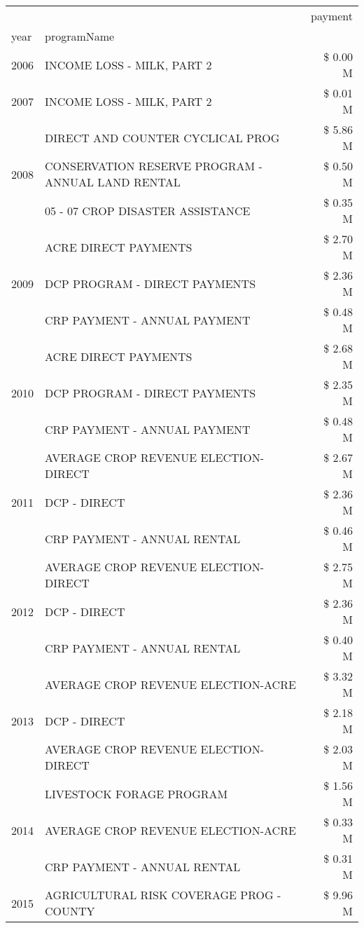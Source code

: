 \begin{tabular}{llr}
\toprule
 &  & payment \\
year & programName &  \\
\midrule
2006 & INCOME LOSS - MILK, PART 2 & \$ 0.00 M \\
\cline{1-3}
2007 & INCOME LOSS - MILK, PART 2 & \$ 0.01 M \\
\cline{1-3}
\multirow[t]{3}{*}{2008} & DIRECT AND COUNTER CYCLICAL PROG & \$ 5.86 M \\
 & CONSERVATION RESERVE PROGRAM - ANNUAL LAND RENTAL & \$ 0.50 M \\
 & 05 - 07 CROP DISASTER ASSISTANCE & \$ 0.35 M \\
\cline{1-3}
\multirow[t]{3}{*}{2009} & ACRE DIRECT PAYMENTS & \$ 2.70 M \\
 & DCP PROGRAM - DIRECT PAYMENTS & \$ 2.36 M \\
 & CRP PAYMENT - ANNUAL PAYMENT & \$ 0.48 M \\
\cline{1-3}
\multirow[t]{3}{*}{2010} & ACRE DIRECT PAYMENTS & \$ 2.68 M \\
 & DCP PROGRAM - DIRECT PAYMENTS & \$ 2.35 M \\
 & CRP PAYMENT - ANNUAL PAYMENT & \$ 0.48 M \\
\cline{1-3}
\multirow[t]{3}{*}{2011} & AVERAGE CROP REVENUE ELECTION-DIRECT & \$ 2.67 M \\
 & DCP - DIRECT & \$ 2.36 M \\
 & CRP PAYMENT - ANNUAL RENTAL & \$ 0.46 M \\
\cline{1-3}
\multirow[t]{3}{*}{2012} & AVERAGE CROP REVENUE ELECTION-DIRECT & \$ 2.75 M \\
 & DCP - DIRECT & \$ 2.36 M \\
 & CRP PAYMENT - ANNUAL RENTAL & \$ 0.40 M \\
\cline{1-3}
\multirow[t]{3}{*}{2013} & AVERAGE CROP REVENUE ELECTION-ACRE & \$ 3.32 M \\
 & DCP - DIRECT & \$ 2.18 M \\
 & AVERAGE CROP REVENUE ELECTION-DIRECT & \$ 2.03 M \\
\cline{1-3}
\multirow[t]{3}{*}{2014} & LIVESTOCK FORAGE PROGRAM & \$ 1.56 M \\
 & AVERAGE CROP REVENUE ELECTION-ACRE & \$ 0.33 M \\
 & CRP PAYMENT - ANNUAL RENTAL & \$ 0.31 M \\
\cline{1-3}
\multirow[t]{3}{*}{2015} & AGRICULTURAL RISK COVERAGE PROG - COUNTY & \$ 9.96 M \\

\end{tabular}

